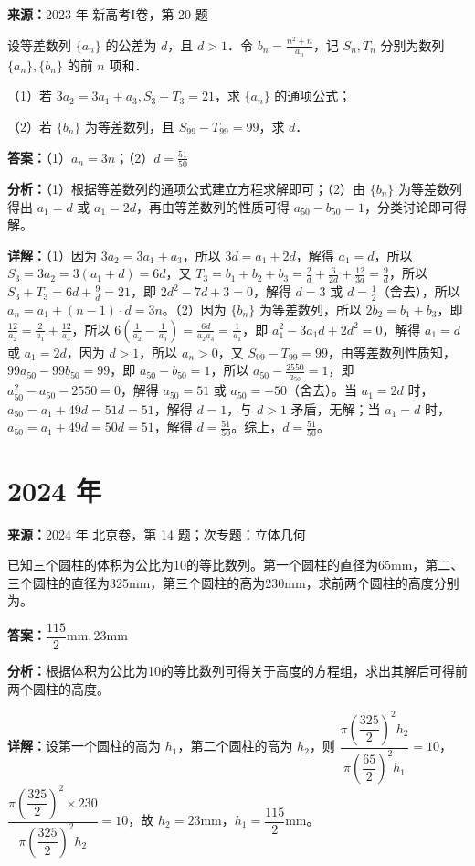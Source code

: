 \begin{question}[points=12]
\textbf{来源：}2023 年 新高考I卷，第 20 题\par
设等差数列 $\{a_n\}$ 的公差为 $d$，且 $d>1$．令 $b_n=\frac{n^2+n}{a_n}$，记 $S_n, T_n$ 分别为数列 $\{a_n\}, \{b_n\}$ 的前 $n$ 项和．

（1）若 $3a_2=3a_1+a_3, S_3+T_3=21$，求 $\{a_n\}$ 的通项公式；

（2）若 $\{b_n\}$ 为等差数列，且 $S_{99}-T_{99}=99$，求 $d$．
\begin{solution}
\textbf{答案：}（1）$a_n=3n$；（2）$d=\frac{51}{50}$

\textbf{分析：}（1）根据等差数列的通项公式建立方程求解即可；（2）由 $\{b_n\}$ 为等差数列得出 $a_1=d$ 或 $a_1=2d$，再由等差数列的性质可得 $a_{50}-b_{50}=1$，分类讨论即可得解。

\textbf{详解：}（1）因为 $3a_2=3a_1+a_3$，所以 $3d=a_1+2d$，解得 $a_1=d$，所以 $S_3=3a_2=3(a_1+d)=6d$，又 $T_3=b_1+b_2+b_3=\frac{2}{d}+\frac{6}{2d}+\frac{12}{3d}=\frac{9}{d}$，所以 $S_3+T_3=6d+\frac{9}{d}=21$，即 $2d^2-7d+3=0$，解得 $d=3$ 或 $d=\frac{1}{2}$（舍去），所以 $a_n=a_1+(n-1)\cdot d=3n$。（2）因为 $\{b_n\}$ 为等差数列，所以 $2b_2=b_1+b_3$，即 $\frac{12}{a_2}=\frac{2}{a_1}+\frac{12}{a_3}$，所以 $6(\frac{1}{a_2}-\frac{1}{a_3})=\frac{6d}{a_2a_3}=\frac{1}{a_1}$，即 $a_1^2-3a_1d+2d^2=0$，解得 $a_1=d$ 或 $a_1=2d$，因为 $d>1$，所以 $a_n>0$，又 $S_{99}-T_{99}=99$，由等差数列性质知，$99a_{50}-99b_{50}=99$，即 $a_{50}-b_{50}=1$，所以 $a_{50}-\frac{2550}{a_{50}}=1$，即 $a_{50}^2-a_{50}-2550=0$，解得 $a_{50}=51$ 或 $a_{50}=-50$（舍去）。当 $a_1=2d$ 时，$a_{50}=a_1+49d=51d=51$，解得 $d=1$，与 $d>1$ 矛盾，无解；当 $a_1=d$ 时，$a_{50}=a_1+49d=50d=51$，解得 $d=\frac{51}{50}$。综上，$d=\frac{51}{50}$。
\end{solution}
\end{question}

\section*{2024 年}

\begin{question}[points=5]
\textbf{来源：}2024 年 北京卷，第 14 题；次专题：立体几何\par
已知三个圆柱的体积为公比为10的等比数列。第一个圆柱的直径为65mm，第二、三个圆柱的直径为325mm，第三个圆柱的高为230mm，求前两个圆柱的高度分别为。
\begin{solution}
\textbf{答案：}$\dfrac{115}{2}\text{mm},23\text{mm}$

\textbf{分析：}根据体积为公比为10的等比数列可得关于高度的方程组，求出其解后可得前两个圆柱的高度。

\textbf{详解：}设第一个圆柱的高为 $h_1$，第二个圆柱的高为 $h_2$，则 $\dfrac{\pi\left(\dfrac{325}{2}\right)^2 h_2}{\pi\left(\dfrac{65}{2}\right)^2 h_1} = 10$，$\dfrac{\pi\left(\dfrac{325}{2}\right)^2 \times 230}{\pi\left(\dfrac{325}{2}\right)^2 h_2} = 10$，故 $h_2 = 23\text{mm}$，$h_1 = \dfrac{115}{2}\text{mm}$。
\end{solution}
\end{question}

